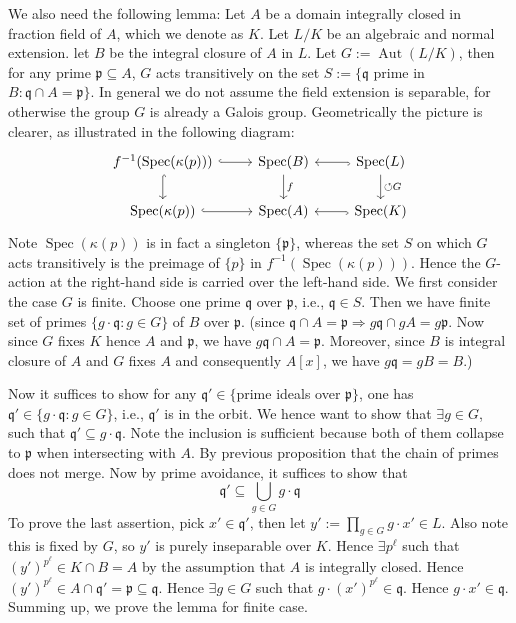 \documentclass[12pt]{article}
\theoremstyle{definition}
\theoremstyle{plain}
\DeclareMathOperator{\Spec}{Spec}
\DeclareMathOperator{\Aut}{Aut}
\begin{document}
\medskip
We also need the following lemma:
 Let $A$ be a domain integrally closed in fraction field of $A$, which we denote as $K$. Let $L/K$ be an algebraic and normal extension. let $B$ be the integral closure of $A$ in $L$. Let $G:=\Aut(L/K)$, then for any prime $\mathfrak{p}\subseteq A$, $G$ acts transitively on the set $S:=\{\mathfrak{q}$ prime in $B: \mathfrak{q}\cap A=\mathfrak{p}\}$.
\Rmk In general we do not assume the field extension is separable, for otherwise the group $G$ is already a Galois group. Geometrically the picture is clearer, as illustrated in the following diagram:
\begin{equation}
  \begin{tikzcd}
  f^{-1}(\Spec(\kappa(p)))\ar[hook]{r}\ar[hook]{d}&\Spec(B)\ar{d}{f} &\Spec(L)\ar[hook]{l}\ar{d}{\circlearrowleft G}\\
   \Spec(\kappa(p))\ar[hook]{r} &\Spec(A)&\Spec(K)\ar[hook]{l}
  \end{tikzcd}
\end{equation}
Note $\Spec(\kappa(p))$ is in fact a singleton $\{\mathfrak{p}\}$, whereas the set $S$ on which $G$ acts transitively is the preimage of $\{p\}$ in $f^{-1}(\Spec(\kappa(p)))$. Hence the $G$-action at the right-hand side is carried over the left-hand side.
\proof We first consider the case $G$ is finite. Choose one prime $\mathfrak{q}$ over $\mathfrak{p}$, i.e., $\mathfrak{q} \in S$. Then we have finite set of primes $\{g\cdot \mathfrak{q}: g\in G\}$ of $B$ over $\mathfrak{p}$. (since $\mathfrak{q}\cap A=\mathfrak{p} \Rightarrow g\mathfrak{q}\cap gA=g\mathfrak{p}$. Now since $G$ fixes $K$ hence $A$ and $\mathfrak{p}$, we have $g\mathfrak{q}\cap A=\mathfrak{p}$. Moreover, since $B$ is integral closure of $A$ and $G$ fixes $A$ and consequently $A[x]$, we have $g\mathfrak{q}=gB=B$.)

\medskip
Now it suffices to show for any $\mathfrak{q}'\in \{$prime ideals over $\mathfrak{p}\}$, one has $\mathfrak{q}'\in \{g\cdot \mathfrak{q}:g\in G\}$, i.e., $\mathfrak{q}'$ is in the orbit. We hence want to show that $\exists g\in G$, such that $\mathfrak{q}'\subseteq g\cdot \mathfrak{q}$. Note the inclusion is sufficient because both of them collapse to $\mathfrak{p}$ when intersecting with $A$. By previous proposition that the chain of primes does not merge. Now by prime avoidance, it suffices to show that
\[\mathfrak{q}'\subseteq \bigcup_{g\in G} g\cdot \mathfrak{q}\]
To prove the last assertion, pick $x'\in \mathfrak{q}'$, then let $y':=\prod_{g\in G}g\cdot x'\in L$. Also note this is fixed by $G$, so $y'$ is purely inseparable over $K$. Hence $\exists p^\ell$ such that $(y')^{p^\ell}\in K\cap B=A$ by the assumption that $A$ is integrally closed. Hence $(y')^{p^\ell}\in A\cap \mathfrak{q}'=\mathfrak{p}\subseteq \mathfrak{q}$. Hence $\exists g\in G$ such that $g\cdot (x')^{p^\ell}\in \mathfrak{q}$. Hence $g\cdot x'\in \mathfrak{q}$. Summing up, we prove the lemma for finite case.
\end{document}
